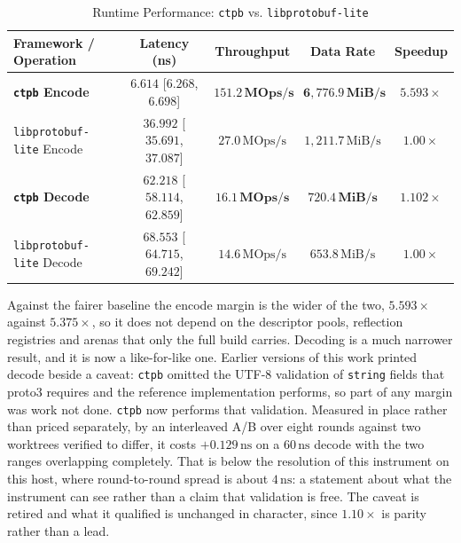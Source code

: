 \begin{table}[ht]
\centering
\caption{Runtime Performance: \texttt{ctpb} vs. \texttt{libprotobuf-lite}}
\label{tab:lite_comparison}
\renewcommand{\arraystretch}{1.2}
\setlength{\tabcolsep}{2pt}
\tiny
\begin{tabular}{|l|c|c|c|c|}
\hline
\textbf{Framework / Operation} & \textbf{Latency (ns)} & \textbf{Throughput} & \textbf{Data Rate} & \textbf{Speedup} \\ \hline
\textbf{\texttt{ctpb} Encode} & $\mathbf{6.614}$ [$6.268$, $6.698$] & $\mathbf{151.2\,\text{MOps/s}}$ & $\mathbf{6{,}776.9\,\text{MiB/s}}$ & $\mathbf{5.593\times}$ \\ \hline
\texttt{libprotobuf-lite} Encode & $36.992$ [$35.691$, $37.087$] & $27.0\,\text{MOps/s}$ & $1{,}211.7\,\text{MiB/s}$ & $1.00\times$ \\ \hline\hline
\textbf{\texttt{ctpb} Decode} & $\mathbf{62.218}$ [$58.114$, $62.859$] & $\mathbf{16.1\,\text{MOps/s}}$ & $\mathbf{720.4\,\text{MiB/s}}$ & $\mathbf{1.102\times}$ \\ \hline
\texttt{libprotobuf-lite} Decode & $68.553$ [$64.715$, $69.242$] & $14.6\,\text{MOps/s}$ & $653.8\,\text{MiB/s}$ & $1.00\times$ \\ \hline
\end{tabular}
\end{table}

Against the fairer baseline the encode margin is the wider of the two, $5.593\times$ against $5.375\times$, so it does not depend on the descriptor pools, reflection registries and arenas that only the full build carries. Decoding is a much narrower result, and it is now a like-for-like one. Earlier versions of this work printed decode beside a caveat: \texttt{ctpb} omitted the UTF-8 validation of \texttt{string} fields that proto3 requires and the reference implementation performs, so part of any margin was work not done. \texttt{ctpb} now performs that validation. Measured in place rather than priced separately, by an interleaved A/B over eight rounds against two worktrees verified to differ, it costs $+0.129\,\text{ns}$ on a $60\,\text{ns}$ decode with the two ranges overlapping completely. That is below the resolution of this instrument on this host, where round-to-round spread is about $4\,\text{ns}$: a statement about what the instrument can see rather than a claim that validation is free. The caveat is retired and what it qualified is unchanged in character, since $1.10\times$ is parity rather than a lead.

